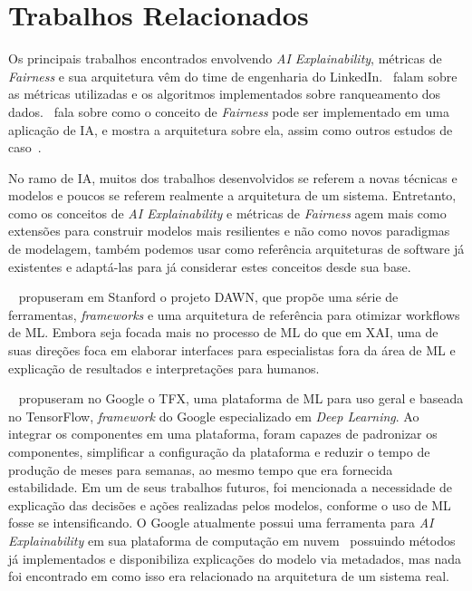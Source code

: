 \documentclass[portugues, 12pt, a4paper]{article}
\begin{document}
\section{Trabalhos Relacionados}

Os principais trabalhos encontrados envolvendo \textit{AI Explainability}, métricas de \textit{Fairness} e sua arquitetura vêm do time de engenharia do LinkedIn.~\citet{Geyik_2019} falam sobre as métricas utilizadas e os algoritmos implementados sobre ranqueamento dos dados.~\citet{Kenthapadi_2019} fala sobre como o conceito de \textit{Fairness} pode ser implementado em uma aplicação de IA, e mostra a arquitetura sobre ela, assim como outros estudos de caso~\citep{Kenthapadi_2020}.

No ramo de IA, muitos dos trabalhos desenvolvidos se referem a novas técnicas e modelos e poucos se referem realmente a arquitetura de um sistema. Entretanto, como os conceitos de \textit{AI Explainability} e métricas de \textit{Fairness} agem mais como extensões para construir modelos mais resilientes e não como novos paradigmas de modelagem, também podemos usar como referência arquiteturas de software já existentes e adaptá-las para já considerar estes conceitos desde sua base.

~\citet{Ballis_2017} propuseram em Stanford o projeto DAWN, que propõe uma série de ferramentas, \textit{frameworks} e uma arquitetura de referência para otimizar workflows de ML. Embora seja focada mais no processo de ML do que em XAI, uma de suas direções foca em elaborar interfaces para especialistas fora da área de ML e explicação de resultados e interpretações para humanos.

~\citet{Modi_2017} propuseram no Google o TFX, uma plataforma de ML para uso geral e baseada no TensorFlow, \textit{framework} do Google especializado em \textit{Deep Learning}. Ao integrar os componentes em uma plataforma, foram capazes de padronizar os componentes, simplificar a configuração da plataforma e reduzir o tempo de produção de meses para semanas, ao mesmo tempo que era fornecida estabilidade. Em um de seus trabalhos futuros, foi mencionada a necessidade de explicação das decisões e ações realizadas pelos modelos, conforme o uso de ML fosse se intensificando. O Google atualmente possui uma ferramenta para \textit{AI Explainability} em sua plataforma de computação em nuvem~\citep{Google_2021} possuindo métodos já implementados e disponibiliza explicações do modelo via metadados, mas nada foi encontrado em como isso era relacionado na arquitetura de um sistema real.
\end{document}
